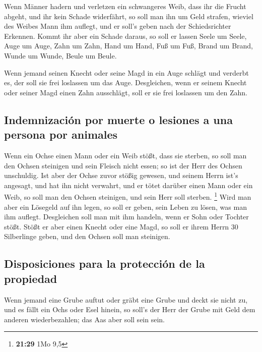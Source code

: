  Wenn Männer hadern und verletzen ein schwangeres Weib,
dass ihr die Frucht abgeht, und ihr kein Schade widerfährt, so soll man
ihn um Geld strafen, wieviel des Weibes Mann ihm auflegt, und er soll's
geben nach der Schiedsrichter Erkennen.  Kommt ihr aber
ein Schade daraus, so soll er lassen Seele um Seele, 
Auge um Auge, Zahn um Zahn, Hand um Hand, Fuß um Fuß, 
Brand um Brand, Wunde um Wunde, Beule um Beule.

 Wenn jemand seinen Knecht oder seine Magd in ein Auge
schlägt und verderbt es, der soll sie frei loslassen um das Auge.
 Desgleichen, wenn er seinem Knecht oder seiner Magd
einen Zahn ausschlägt, soll er sie frei loslassen um den Zahn.

\hypertarget{indemnizaciuxf3n-por-muerte-o-lesiones-a-una-persona-por-animales}{%
\subsection{Indemnización por muerte o lesiones a una persona por
animales}\label{indemnizaciuxf3n-por-muerte-o-lesiones-a-una-persona-por-animales}}

 Wenn ein Ochse einen Mann oder ein Weib stößt, dass sie
sterben, so soll man den Ochsen steinigen und sein Fleisch nicht essen;
so ist der Herr des Ochsen unschuldig.  Ist aber der
Ochse zuvor stößig gewesen, und seinem Herrn ist's angesagt, und hat ihn
nicht verwahrt, und er tötet darüber einen Mann oder ein Weib, so soll
man den Ochsen steinigen, und sein Herr soll sterben. \footnote{\textbf{21:29}
  1Mo 9,5}  Wird man aber ein Lösegeld auf ihn legen, so
soll er geben, sein Leben zu lösen, was man ihm auflegt. 
Desgleichen soll man mit ihm handeln, wenn er Sohn oder Tochter stößt.
 Stößt er aber einen Knecht oder eine Magd, so soll er
ihrem Herrn 30 Silberlinge geben, und den Ochsen soll man steinigen.

\hypertarget{disposiciones-para-la-protecciuxf3n-de-la-propiedad}{%
\subsection{Disposiciones para la protección de la
propiedad}\label{disposiciones-para-la-protecciuxf3n-de-la-propiedad}}

 Wenn jemand eine Grube auftut oder gräbt eine Grube und
deckt sie nicht zu, und es fällt ein Ochs oder Esel hinein,
 so soll's der Herr der Grube mit Geld dem anderen
wiederbezahlen; das Aas aber soll sein sein.

